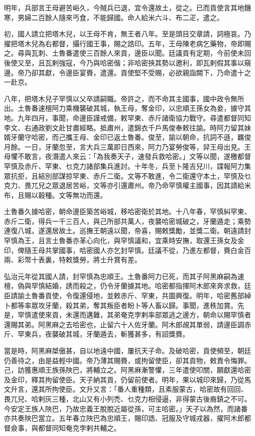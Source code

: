 \begin{pinyinscope}
明年，兵部言王母避苦峪久，今賊兵已退，宜令還故土，從之。已而貢使言其地饑寒，男婦二百餘人隨來丐食，不能歸國。命人給米六斗、布二疋，遣之。

初，國人請立把塔木兒，以王母不肯，無王者八年。至是頭目交章請，詞極哀。乃擢把塔木兒為右都督，攝行國王事，賜之誥印。五年，王母陳老病乞藥物，帝即賜之。尋與瓦刺、土魯番遣使三百餘人來貢，邊臣以聞。廷議貢有定期，今前使未回後使又至，且瓦剌強寇，今乃與哈密偕；非哈密挾其勢以邀利，即瓦剌假其事以窺邊。帝乃卻其獻，令邊臣宴賚，遣還。貢使堅不受賜，必欲親詣闕下，乃命遣十之一赴京。

八年，把塔木兒子罕慎以父卒請嗣職。帝許之，而不命其主國事，國中政令無所出。土魯番速檀阿力乘機襲破其城，執王母，奪金印，以忠順王孫女為妾，據守其地。九年四月，事聞，命邊臣謹戒備，敕罕東、赤斤諸衛協力戰守。尋遣都督同知李文、右通政劉文赴甘肅經略。抵肅州，遣錦衣千戶馬俊奉敕往諭。時阿力留其妹婿牙蘭守哈密，而己攜王母、金印已返土魯番。俊至，諭以朝命，抗詞不遜，羈俊月餘。一日，牙蘭忽至，言大兵三萬即日西來，阿力乃宴勞俊等，舁王母出見。王母懼不敢言，夜潛遣人來云：「為我奏天子，速發兵救哈密。」文等以聞，遂檄都督罕慎及赤斤、罕東、乜克力諸部集兵進討。十年冬，兵至卜隆吉兒川，諜報阿力集眾抗拒，且結別部謀掠罕東、赤斤二衛。文等不敢進，令二衛還守本土，罕慎及乜克力、畏兀兒之眾退居苦峪，文等亦引還肅州。帝乃命罕慎權主國事，因其請給米布，且賜以穀種。文等無功而還。

土魯番久據哈密，朝命邊臣築苦峪城，移哈密衛於其地。十八年春，罕慎糾罕東、赤斤二衛，得兵一千三百人，與己所部共萬人，夜襲哈密城破之，牙蘭遁走；乘勢連復八城，遂還居故土。巡撫王朝遠以聞，帝喜，賜敕獎勵，並獎二衛。朝遠請封罕慎為王，且言土魯番亦革心向化，與罕慎議和，宜乘時安撫，取還王孫女及金印，俾隨王母共掌國事，哈密國人亦乞封罕慎。廷議不從，乃進左都督，賚白金百兩、彩幣十表裏，特敕獎勞，將士升賞有差。

弘治元年從其國人請，封罕慎為忠順王。土魯番阿力已死，而其子阿黑麻嗣為速檀，偽與罕慎結婚，誘而殺之，仍令牙蘭據其地。哈密都指揮阿木郎來奔求救，廷臣請諭土魯番貢使，令復還侵地，並敕赤斤、罕東，共圖興復。明年，哈密舊部綽卜都等率眾攻牙蘭，殺其弟，奪其叛臣者盼卜等人畜以歸。事聞，進秩加賞。先是，罕慎遣使來貢，未還而遘難，其弟奄克孛剌率部眾逃之邊方，朝命以賜罕慎者還賜其弟。阿黑麻之去哈密也，止留六十人佐牙蘭。阿木郎覘其單弱，請邊臣調赤斤、罕東兵，夜襲破其城，牙蘭遁去，斬獲甚多，有詔獎賚。

當是時，阿黑麻桀傲甚，自以地遠中國，屢抗天子命。及破哈密，貢使頻至，朝廷仍善待之，由是益輕中國。帝乃薄其賜賚，或拘留使臣，卻其貢物，敕責令悔罪。己，訪獲惠順王族孫陜巴，將輔立之。阿黑麻漸警懼，三年遣使叩關，願獻還哈密及金印，釋其拘留使臣。天子納其貢，仍留前使者。明年，果以城印來歸，乃從馬文升言，還其所拘使臣。文升又言：「番人重種類，且素服蒙古，哈密故有回回、畏兀兒、哈剌灰三種，北山又有小列禿、乜克力相侵逼，非得蒙古後裔鎮之不可。今安定王族人陜巴，乃故忠義王脫脫近屬從孫，可主哈密。」天子以為然，而諸番亦共奏陜巴當立。五年春立陜巴為忠順王，賜印誥、冠服及守城戎器，擢阿木郎都督僉事，與都督同知奄克孛剌共輔之。


\end{pinyinscope}
